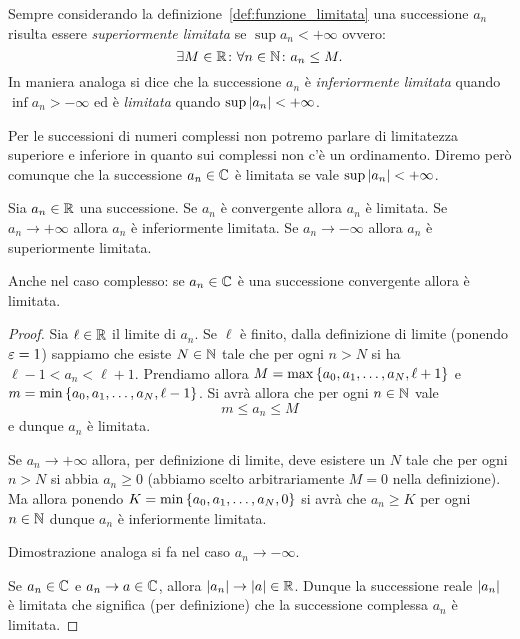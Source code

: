 Sempre considerando la definizione~\ref{def:funzione_limitata}
una successione $a_n$ risulta essere
\emph{superiormente limitata}
%
%
se $\sup a_n < +\infty$
ovvero:
\[
  \exists M\in \mathbb R\colon \forall n \in \mathbb N\colon a_n \le M.
\]
In maniera analoga si dice che la successione $a_n$ è
\emph{inferiormente limitata}
%
quando $\inf a_n > -\infty$
ed è \emph{limitata}
%
%
quando $\sup {\left|a_n\right|}< +\infty$.

Per le successioni di numeri complessi non potremo parlare di
limitatezza superiore e inferiore in quanto sui complessi non c'è
un ordinamento.
Diremo però comunque che la successione
$a_n\in \mathbb C$ è limitata se vale $\sup {\left|a_n\right|} < +\infty$.

\begin{theorem}
\mymark{**}
Sia $a_n\in\mathbb R$ una successione.
Se $a_n$ è convergente allora $a_n$ è limitata.
Se $a_n\to +\infty$ allora $a_n$ è inferiormente limitata.
Se $a_n\to -\infty$ allora $a_n$ è superiormente limitata.

Anche nel caso complesso:
se $a_n\in \mathbb C$ è una successione convergente allora è
limitata.
\end{theorem}
%
\begin{proof}
Sia $\ell \in \mathbb R$ il limite di $a_n$.
Se $\ell$ è finito,
dalla definizione di limite (ponendo $\varepsilon=1$) sappiamo che esiste $N\in \mathbb N$
tale che per ogni $n> N$ si ha $\ell -1 < a_n < \ell+ 1$.
Prendiamo allora $M=\max{\left\{ a_0, a_1, \dots, a_N, \ell +1 \right\}}$
e $m =\min {\left\{ a_0, a_1, \dots, a_N, \ell-1 \right\}}$. Si avrà allora
che per ogni $n\in \mathbb N$ vale
\[
  m \le a_n \le M
\]
e dunque $a_n$ è limitata.

Se $a_n \to +\infty$ allora, per definizione di limite, deve esistere un $N$
tale che per ogni $n>N$ si abbia $a_n \ge 0$ (abbiamo scelto arbitrariamente
$M=0$ nella definizione). Ma allora ponendo $K=\min{\left\{ a_0, a_1, \dots, a_N, 0 \right\}}$
si avrà che $a_n\ge K$ per ogni $n\in \mathbb N$ dunque $a_n$ è inferiormente
limitata.

Dimostrazione analoga si fa nel caso $a_n \to -\infty$.

Se $a_n\in \mathbb C$ e $a_n\to a\in \mathbb C$, allora ${\left|a_n\right|}\to {\left|a\right|}\in \mathbb R$.
Dunque la successione reale ${\left|a_n\right|}$ è limitata che significa (per definizione)
che la successione complessa $a_n$ è limitata.
\end{proof}

